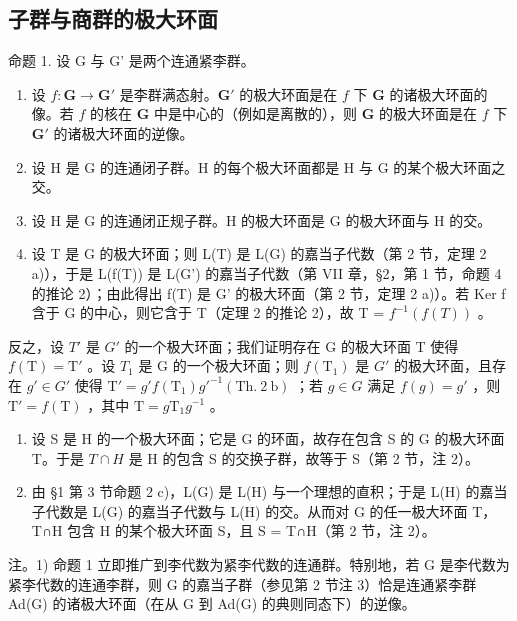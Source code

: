 \subsection{子群与商群的极大环面}

命题 1. 设 G 与 G' 是两个连通紧李群。

\begin{enumerate}
\def\labelenumi{\alph{enumi})}
\item
  设 \(f: \mathbf{G} \to \mathbf{G}'\) 是李群满态射。\(\mathbf{G}'\) 的极大环面是在 \(f\) 下 \(\mathbf{G}\) 的诸极大环面的像。若 \(f\) 的核在 \(\mathbf{G}\) 中是中心的（例如是离散的），则 \(\mathbf{G}\) 的极大环面是在 \(f\) 下 \(\mathbf{G}'\) 的诸极大环面的逆像。
\item
  设 \(\mathrm{H}\) 是 \(\mathrm{G}\) 的连通闭子群。\(\mathrm{H}\) 的每个极大环面都是 \(\mathrm{H}\) 与 \(\mathrm{G}\) 的某个极大环面之交。
\item
  设 H 是 G 的连通闭正规子群。H 的极大环面是 G 的极大环面与 H 的交。
\item
  设 T 是 G 的极大环面；则 L(T) 是 L(G) 的嘉当子代数（第 2 节，定理 2 a)），于是 L(f(T)) 是 L(G') 的嘉当子代数（第 VII 章，§2，第 1 节，命题 4 的推论 2）；由此得出 f(T) 是 G' 的极大环面（第 2 节，定理 2 a)）。若 Ker f 含于 G 的中心，则它含于 T（定理 2 的推论 2），故 T = \(f^{-1}(f(T))\) 。
\end{enumerate}

反之，设 \(T'\) 是 \(G'\) 的一个极大环面；我们证明存在 G 的极大环面 T 使得 \(f(\mathrm{T}) = \mathrm{T}'\) 。设 \(T_{1}\) 是 G 的一个极大环面；则 \(f(\mathrm{T}_{1})\) 是 \(G'\) 的极大环面，且存在 \(g' \in G'\) 使得 \(\mathrm{T}' = g' f(\mathrm{T}_{1}) g'^{-1} (\mathrm{Th.~2~b})\) ；若 \(g \in G\) 满足 \(f(g) = g'\) ，则 \(\mathrm{T}' = f(\mathrm{T})\) ，其中 \(\mathrm{T} = g\mathrm{T}_{1}g^{-1}\) 。

\begin{enumerate}
\def\labelenumi{\alph{enumi})}
\setcounter{enumi}{1}
\item
  设 S 是 H 的一个极大环面；它是 G 的环面，故存在包含 S 的 G 的极大环面 T。于是 \(T \cap H\) 是 H 的包含 S 的交换子群，故等于 S（第 2 节，注 2）。
\item
  由 §1 第 3 节命题 2 c)，L(G) 是 L(H) 与一个理想的直积；于是 L(H) 的嘉当子代数是 L(G) 的嘉当子代数与 L(H) 的交。从而对 G 的任一极大环面 T，T∩H 包含 H 的某个极大环面 S，且 S = T∩H（第 2 节，注 2）。
\end{enumerate}

注。1) 命题 1 立即推广到李代数为紧李代数的连通群。特别地，若 G 是李代数为紧李代数的连通李群，则 G 的嘉当子群（参见第 2 节注 3）恰是连通紧李群 Ad(G) 的诸极大环面（在从 G 到 Ad(G) 的典则同态下）的逆像。

